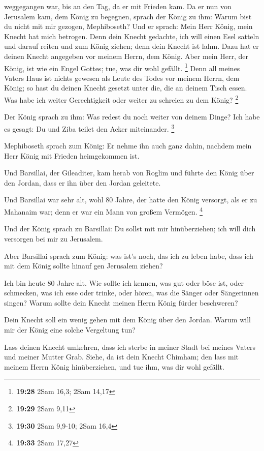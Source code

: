 weggegangen war, bis an den Tag, da er mit Frieden kam. 
Da er nun von Jerusalem kam, dem König zu begegnen, sprach der König zu
ihm: Warum bist du nicht mit mir gezogen, Mephiboseth? 
Und er sprach: Mein Herr König, mein Knecht hat mich betrogen. Denn dein
Knecht gedachte, ich will einen Esel satteln und darauf reiten und zum
König ziehen; denn dein Knecht ist lahm.  Dazu hat er
deinen Knecht angegeben vor meinem Herrn, dem König. Aber mein Herr, der
König, ist wie ein Engel Gottes; tue, was dir wohl gefällt. \footnote{\textbf{19:28}
  2Sam 16,3; 2Sam 14,17}  Denn all meines Vaters Haus ist
nichts gewesen als Leute des Todes vor meinem Herrn, dem König; so hast
du deinen Knecht gesetzt unter die, die an deinem Tisch essen. Was habe
ich weiter Gerechtigkeit oder weiter zu schreien zu dem König?
\footnote{\textbf{19:29} 2Sam 9,11}

 Der König sprach zu ihm: Was redest du noch weiter von
deinem Dinge? Ich habe es gesagt: Du und Ziba teilet den Acker
miteinander. \footnote{\textbf{19:30} 2Sam 9,9-10; 2Sam 16,4}

 Mephiboseth sprach zum König: Er nehme ihn auch ganz
dahin, nachdem mein Herr König mit Frieden heimgekommen ist.

 Und Barsillai, der Gileaditer, kam herab von Roglim und
führte den König über den Jordan, dass er ihn über den Jordan geleitete.

 Und Barsillai war sehr alt, wohl 80 Jahre, der hatte den
König versorgt, als er zu Mahanaim war; denn er war ein Mann von großem
Vermögen. \footnote{\textbf{19:33} 2Sam 17,27}

 Und der König sprach zu Barsillai: Du sollst mit mir
hinüberziehen; ich will dich versorgen bei mir zu Jerusalem.

 Aber Barsillai sprach zum König: was ist's noch, das ich
zu leben habe, dass ich mit dem König sollte hinauf gen Jerusalem
ziehen?

 Ich bin heute 80 Jahre alt. Wie sollte ich kennen, was
gut oder böse ist, oder schmecken, was ich esse oder trinke, oder hören,
was die Sänger oder Sängerinnen singen? Warum sollte dein Knecht meinen
Herrn König fürder beschweren?

 Dein Knecht soll ein wenig gehen mit dem König über den
Jordan. Warum will mir der König eine solche Vergeltung tun?

 Lass deinen Knecht umkehren, dass ich sterbe in meiner
Stadt bei meines Vaters und meiner Mutter Grab. Siehe, da ist dein
Knecht Chimham; den lass mit meinem Herrn König hinüberziehen, und tue
ihm, was dir wohl gefällt.

